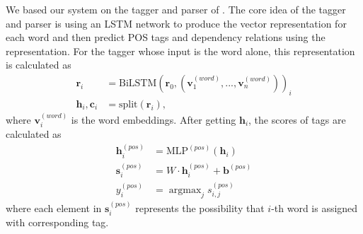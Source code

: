 \documentclass[11pt,a4paper]{article}
\DeclareMathOperator*{\argmax}{argmax}
\begin{document}
We based our system on the tagger and parser of \citet{dozat-qi-manning:2017:K17-3}.
The core idea of the tagger and parser
is using an LSTM network to produce the vector representation
for each word and then predict POS tags and dependency relations
using the representation.
For the tagger whose input is the word alone,
this representation is calculated as
\begin{align*}
\mathbf{r}_i & =  \text{BiLSTM}(\mathbf{r}_0, (\mathbf{v}_1^{(word)}, ..., \mathbf{v}_n^{(word)}))_i \\
\mathbf{h}_i, \mathbf{c}_i & = \text{split}(\mathbf{r}_i),
\end{align*}
where $\mathbf{v}_i^{(word)}$ is the word embeddings.
After getting $\mathbf{h}_i$,
the scores of tags are calculated as
\begin{align*}
\mathbf{h}_i^{(pos)} & = \text{MLP}^{(pos)} (\mathbf{h}_i) \\
\mathbf{s}_i^{(pos)} & = W \cdot \mathbf{h}_i^{(pos)} + \mathbf{b}^{(pos)} \\
y_i^{(pos)} & = \argmax_{j} s_{i, j}^{(pos)} 
\end{align*}
where each element in $\mathbf{s}_i^{(pos)}$ represents the possibility
that $i$-th word is assigned with corresponding tag.
\end{document}

